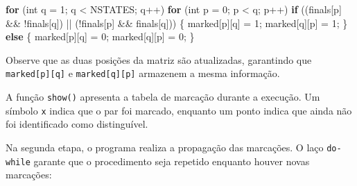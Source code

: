 \documentclass[
  brazilian,
  letterpaper,
]{book}
\newenvironment{Shaded}{\begin{snugshade}}{\end{snugshade}}
\newcommand{\ControlFlowTok}[1]{\textcolor[rgb]{0.00,0.23,0.31}{\textbf{#1}}}
\newcommand{\DataTypeTok}[1]{\textcolor[rgb]{0.68,0.00,0.00}{#1}}
\newcommand{\DecValTok}[1]{\textcolor[rgb]{0.68,0.00,0.00}{#1}}
\newcommand{\NormalTok}[1]{\textcolor[rgb]{0.00,0.23,0.31}{#1}}
\newcommand{\OperatorTok}[1]{\textcolor[rgb]{0.37,0.37,0.37}{#1}}
\theoremstyle{plain}
\theoremstyle{definition}
\theoremstyle{remark}
\begin{document}
\begin{Shaded}
\begin{Highlighting}[]
\ControlFlowTok{for} \OperatorTok{(}\DataTypeTok{int}\NormalTok{ q }\OperatorTok{=} \DecValTok{1}\OperatorTok{;}\NormalTok{ q }\OperatorTok{\textless{}}\NormalTok{ NSTATES}\OperatorTok{;}\NormalTok{ q}\OperatorTok{++)}
    \ControlFlowTok{for} \OperatorTok{(}\DataTypeTok{int}\NormalTok{ p }\OperatorTok{=} \DecValTok{0}\OperatorTok{;}\NormalTok{ p }\OperatorTok{\textless{}}\NormalTok{ q}\OperatorTok{;}\NormalTok{ p}\OperatorTok{++)}
        \ControlFlowTok{if} \OperatorTok{((}\NormalTok{finals}\OperatorTok{[}\NormalTok{p}\OperatorTok{]} \OperatorTok{\&\&} \OperatorTok{!}\NormalTok{finals}\OperatorTok{[}\NormalTok{q}\OperatorTok{])} \OperatorTok{||}
            \OperatorTok{(!}\NormalTok{finals}\OperatorTok{[}\NormalTok{p}\OperatorTok{]} \OperatorTok{\&\&}\NormalTok{ finals}\OperatorTok{[}\NormalTok{q}\OperatorTok{]))}
        \OperatorTok{\{}
\NormalTok{            marked}\OperatorTok{[}\NormalTok{p}\OperatorTok{][}\NormalTok{q}\OperatorTok{]} \OperatorTok{=} \DecValTok{1}\OperatorTok{;}
\NormalTok{            marked}\OperatorTok{[}\NormalTok{q}\OperatorTok{][}\NormalTok{p}\OperatorTok{]} \OperatorTok{=} \DecValTok{1}\OperatorTok{;}
        \OperatorTok{\}}
        \ControlFlowTok{else}
        \OperatorTok{\{}
\NormalTok{            marked}\OperatorTok{[}\NormalTok{p}\OperatorTok{][}\NormalTok{q}\OperatorTok{]} \OperatorTok{=} \DecValTok{0}\OperatorTok{;}
\NormalTok{            marked}\OperatorTok{[}\NormalTok{q}\OperatorTok{][}\NormalTok{p}\OperatorTok{]} \OperatorTok{=} \DecValTok{0}\OperatorTok{;}
        \OperatorTok{\}}
\end{Highlighting}
\end{Shaded}

Observe que as duas posições da matriz são atualizadas, garantindo que
\texttt{marked{[}p{]}{[}q{]}} e \texttt{marked{[}q{]}{[}p{]}} armazenem
a mesma informação.

A função \texttt{show()} apresenta a tabela de marcação durante a
execução. Um símbolo \texttt{x} indica que o par foi marcado, enquanto
um ponto indica que ainda não foi identificado como distinguível.

Na segunda etapa, o programa realiza a propagação das marcações. O laço
\texttt{do-while} garante que o procedimento seja repetido enquanto
houver novas marcações:
\end{document}
